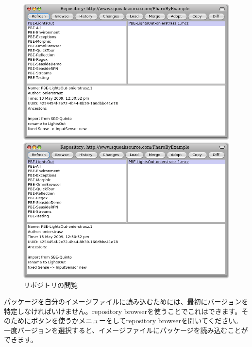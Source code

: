 \documentclass[a4paper,10pt,twoside]{book}
\begin{document}
\begin{figure}[hbt]
\ifluluelse
	{\centerline {\includegraphics[width=\textwidth]{BrowseRepository}}}
	{\centerline {\includegraphics[scale=0.7]{BrowseRepository}}}
\caption{リポジトリの閲覧
}
\end{figure}


パッケージを自分のイメージファイルに読み込むためには、最初にバージョンを特定しなければいけません。repository browserを使うことでこれはできます。そのためにボタンを使うかメニューを\actclick{}してrepository browserを開いてください。一度バージョンを選択すると、イメージファイルにパッケージを読み込むことができます。

\end{document}
